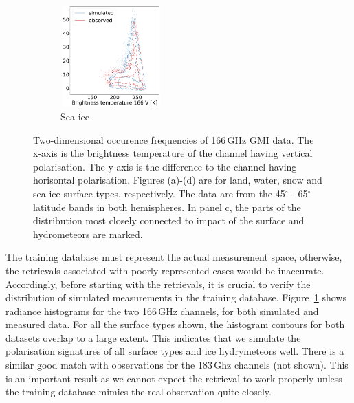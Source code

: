 \documentclass[12pt,oneside,a4paper]{article}
\begin{document}
\begin{figure}[t]
\begin{subfigure}{.24\textwidth}
	\caption{ Sea-ice}
	\includegraphics[height = 39mm, width = 39mm]{Figures/hist2d_gmi_highlat_sea-ice.pdf}
\end{subfigure}
\caption{Two-dimensional occurence frequencies of 166\,GHz GMI data. The x-axis
  is the brightness temperature of the channel having vertical polarisation.
  The y-axis is the difference to the channel having horisontal polarisation.
  Figures (a)-(d) are for land, water, snow and sea-ice surface types,
  respectively. The data are from the 45$^\circ$ - 65$^\circ$ latitude bands in
  both hemispheres. In panel c, the parts of the distribution most closely
  connected to impact of the surface and hydrometeors are marked.}
  \label{fig:histogram_2d}
\end{figure}

The training database must represent the actual measurement space, otherwise,
the retrievals associated with poorly represented cases would be inaccurate.
Accordingly, before starting with the retrievals, it is crucial to verify the
distribution of simulated measurements in the training database.
Figure~\ref{fig:histogram_2d} shows radiance histograms for the two 166\,GHz
channels, for both simulated and measured data. For all the surface types
shown, the histogram contours for both datasets overlap to a large extent. This
indicates that we simulate the polarisation signatures of all surface types and
ice hydrymeteors well. There is a similar good match with observations for the
183\,Ghz channels (not shown). This is an important result as we cannot expect
the retrieval to work properly unless the training database mimics the real
observation quite closely.
\end{document}
